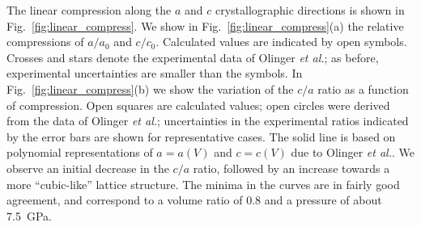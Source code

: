 \documentclass[prb,aps,nobibnotes,twocolumn,doublespace,twocolumngrid,superbib]{revtex4}
\begin{document}
The linear compression along the $a$ and $c$ crystallographic directions
is shown in Fig.~\ref{fig:linear_compress}.  We show in 
Fig.~\ref{fig:linear_compress}(a) the relative compressions of $a/a_0$  and
$c/c_0$.
Calculated values are indicated by open symbols.
Crosses and stars denote the experimental data of 
Olinger {\it et al.}\cite{Olinger_1975v62}; as before, experimental 
uncertainties are smaller than the symbols.  
In Fig.~\ref{fig:linear_compress}(b) we show the variation
of the $c/a$ ratio as a function of compression.  Open squares are 
calculated values; open circles were derived from the data of Olinger
{\it et al.}\cite{Olinger_1975v62}; uncertainties 
in the experimental ratios indicated by the
error bars are shown for representative cases.  The solid line is based
on polynomial representations of $a=a(V)$ and $c=c(V)$ 
due to Olinger {\it et al.}\cite{Olinger_1975v62}. We observe an
initial decrease in the $c/a$ ratio, followed by an increase 
towards a more ``cubic-like'' lattice structure.  
The minima in the curves are in fairly good agreement, 
and correspond to a volume ratio of 0.8 and a pressure of about 7.5~GPa.
\end{document}

